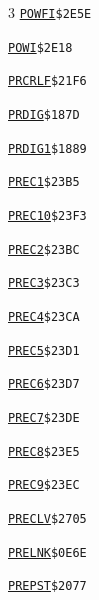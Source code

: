 \begin{multicols}{3}
\noindent\hyperlink{l:POWFI}{\texttt{POWFI}}\hfill\texttt{\$2E5E~\phantom{000}\llap{\pageref{l:POWFI}}}\par
\noindent\hyperlink{l:POWI}{\texttt{POWI}}\hfill\texttt{\$2E18~\phantom{000}\llap{\pageref{l:POWI}}}\par
\noindent\hyperlink{l:PRCRLF}{\texttt{PRCRLF}}\hfill\texttt{\$21F6~\phantom{000}\llap{\pageref{l:PRCRLF}}}\par
\noindent\hyperlink{l:PRDIG}{\texttt{PRDIG}}\hfill\texttt{\$187D~\phantom{000}\llap{\pageref{l:PRDIG}}}\par
\noindent\hyperlink{l:PRDIG1}{\texttt{PRDIG1}}\hfill\texttt{\$1889~\phantom{000}\llap{\pageref{l:PRDIG1}}}\par
\noindent\hyperlink{l:PREC1}{\texttt{PREC1}}\hfill\texttt{\$23B5~\phantom{000}\llap{\pageref{l:PREC1}}}\par
\noindent\hyperlink{l:PREC10}{\texttt{PREC10}}\hfill\texttt{\$23F3~\phantom{000}\llap{\pageref{l:PREC10}}}\par
\noindent\hyperlink{l:PREC2}{\texttt{PREC2}}\hfill\texttt{\$23BC~\phantom{000}\llap{\pageref{l:PREC2}}}\par
\noindent\hyperlink{l:PREC3}{\texttt{PREC3}}\hfill\texttt{\$23C3~\phantom{000}\llap{\pageref{l:PREC3}}}\par
\noindent\hyperlink{l:PREC4}{\texttt{PREC4}}\hfill\texttt{\$23CA~\phantom{000}\llap{\pageref{l:PREC4}}}\par
\noindent\hyperlink{l:PREC5}{\texttt{PREC5}}\hfill\texttt{\$23D1~\phantom{000}\llap{\pageref{l:PREC5}}}\par
\noindent\hyperlink{l:PREC6}{\texttt{PREC6}}\hfill\texttt{\$23D7~\phantom{000}\llap{\pageref{l:PREC6}}}\par
\noindent\hyperlink{l:PREC7}{\texttt{PREC7}}\hfill\texttt{\$23DE~\phantom{000}\llap{\pageref{l:PREC7}}}\par
\noindent\hyperlink{l:PREC8}{\texttt{PREC8}}\hfill\texttt{\$23E5~\phantom{000}\llap{\pageref{l:PREC8}}}\par
\noindent\hyperlink{l:PREC9}{\texttt{PREC9}}\hfill\texttt{\$23EC~\phantom{000}\llap{\pageref{l:PREC9}}}\par
\noindent\hyperlink{l:PRECLV}{\texttt{PRECLV}}\hfill\texttt{\$2705~\phantom{000}\llap{\pageref{l:PRECLV}}}\par
\noindent\hyperlink{l:PRELNK}{\texttt{PRELNK}}\hfill\texttt{\$0E6E~\phantom{000}\llap{\pageref{l:PRELNK}}}\par
\noindent\hyperlink{l:PREPST}{\texttt{PREPST}}\hfill\texttt{\$2077~\phantom{000}\llap{\pageref{l:PREPST}}}\par

\end{multicols}

